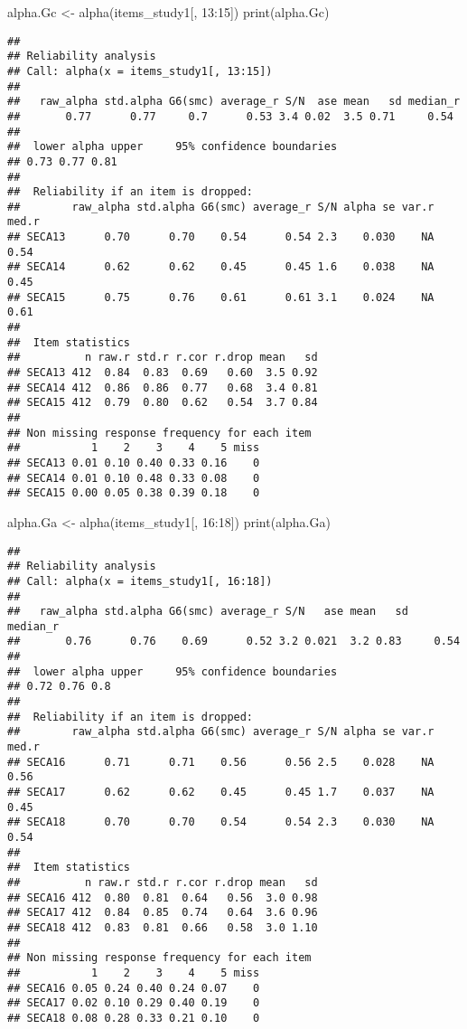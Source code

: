 \documentclass[
]{article}
\newenvironment{Shaded}{\begin{snugshade}}{\end{snugshade}}
\newcommand{\DecValTok}[1]{\textcolor[rgb]{0.00,0.00,0.81}{#1}}
\newcommand{\FunctionTok}[1]{\textcolor[rgb]{0.00,0.00,0.00}{#1}}
\newcommand{\NormalTok}[1]{#1}
\newcommand{\OtherTok}[1]{\textcolor[rgb]{0.56,0.35,0.01}{#1}}
\newcommand{\SpecialCharTok}[1]{\textcolor[rgb]{0.00,0.00,0.00}{#1}}
\begin{document}
\begin{Shaded}
\begin{Highlighting}[]
\NormalTok{alpha.Gc }\OtherTok{\textless{}{-}} \FunctionTok{alpha}\NormalTok{(items\_study1[, }\DecValTok{13}\SpecialCharTok{:}\DecValTok{15}\NormalTok{])}
\FunctionTok{print}\NormalTok{(alpha.Gc)}
\end{Highlighting}
\end{Shaded}

\begin{verbatim}
## 
## Reliability analysis   
## Call: alpha(x = items_study1[, 13:15])
## 
##   raw_alpha std.alpha G6(smc) average_r S/N  ase mean   sd median_r
##       0.77      0.77     0.7      0.53 3.4 0.02  3.5 0.71     0.54
## 
##  lower alpha upper     95% confidence boundaries
## 0.73 0.77 0.81 
## 
##  Reliability if an item is dropped:
##        raw_alpha std.alpha G6(smc) average_r S/N alpha se var.r med.r
## SECA13      0.70      0.70    0.54      0.54 2.3    0.030    NA  0.54
## SECA14      0.62      0.62    0.45      0.45 1.6    0.038    NA  0.45
## SECA15      0.75      0.76    0.61      0.61 3.1    0.024    NA  0.61
## 
##  Item statistics 
##          n raw.r std.r r.cor r.drop mean   sd
## SECA13 412  0.84  0.83  0.69   0.60  3.5 0.92
## SECA14 412  0.86  0.86  0.77   0.68  3.4 0.81
## SECA15 412  0.79  0.80  0.62   0.54  3.7 0.84
## 
## Non missing response frequency for each item
##           1    2    3    4    5 miss
## SECA13 0.01 0.10 0.40 0.33 0.16    0
## SECA14 0.01 0.10 0.48 0.33 0.08    0
## SECA15 0.00 0.05 0.38 0.39 0.18    0
\end{verbatim}

\begin{Shaded}
\begin{Highlighting}[]
\NormalTok{alpha.Ga }\OtherTok{\textless{}{-}} \FunctionTok{alpha}\NormalTok{(items\_study1[, }\DecValTok{16}\SpecialCharTok{:}\DecValTok{18}\NormalTok{])}
\FunctionTok{print}\NormalTok{(alpha.Ga)}
\end{Highlighting}
\end{Shaded}

\begin{verbatim}
## 
## Reliability analysis   
## Call: alpha(x = items_study1[, 16:18])
## 
##   raw_alpha std.alpha G6(smc) average_r S/N   ase mean   sd median_r
##       0.76      0.76    0.69      0.52 3.2 0.021  3.2 0.83     0.54
## 
##  lower alpha upper     95% confidence boundaries
## 0.72 0.76 0.8 
## 
##  Reliability if an item is dropped:
##        raw_alpha std.alpha G6(smc) average_r S/N alpha se var.r med.r
## SECA16      0.71      0.71    0.56      0.56 2.5    0.028    NA  0.56
## SECA17      0.62      0.62    0.45      0.45 1.7    0.037    NA  0.45
## SECA18      0.70      0.70    0.54      0.54 2.3    0.030    NA  0.54
## 
##  Item statistics 
##          n raw.r std.r r.cor r.drop mean   sd
## SECA16 412  0.80  0.81  0.64   0.56  3.0 0.98
## SECA17 412  0.84  0.85  0.74   0.64  3.6 0.96
## SECA18 412  0.83  0.81  0.66   0.58  3.0 1.10
## 
## Non missing response frequency for each item
##           1    2    3    4    5 miss
## SECA16 0.05 0.24 0.40 0.24 0.07    0
## SECA17 0.02 0.10 0.29 0.40 0.19    0
## SECA18 0.08 0.28 0.33 0.21 0.10    0
\end{verbatim}
\end{document}

